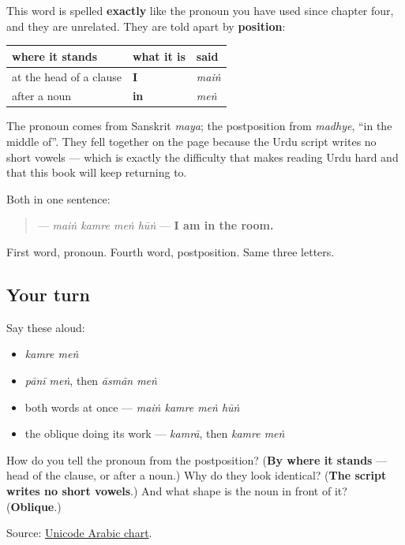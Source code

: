 \begin{grammarlens}[title={Grammar Lens: the same spelling, two different words}]
This word is spelled \textbf{exactly} like the pronoun \textbf{} you have used since chapter four, and they are unrelated. They are told apart by \textbf{position}:

\noindent
\begin{tabularx}{\linewidth}{@{}>{\raggedright\arraybackslash}X>{\raggedright\arraybackslash}X>{\raggedright\arraybackslash}X@{}}
\toprule
\textbf{where it stands} & \textbf{what it is} & \textbf{said} \\
\midrule
at the head of a clause & \textbf{I} & \emph{maiṅ} \\
after a noun & \textbf{in} & \emph{meṅ} \\
\bottomrule
\end{tabularx}

The pronoun comes from Sanskrit \emph{maya}; the postposition from \emph{madhye}, \textquotedblleft{}in the middle of\textquotedblright{}. They fell together on the page because the Urdu script writes no short vowels — which is exactly the difficulty that makes reading Urdu hard and that this book will keep returning to.

Both in one sentence:

\begin{quote}
\textbf{   } — \emph{maiṅ kamre meṅ hūṅ} — \textbf{I am in the room.}
\end{quote}

First word, pronoun. Fourth word, postposition. Same three letters.
\end{grammarlens}

\subsection*{Your turn}
Say these aloud:

\begin{itemize}
\raggedright
  \item \emph{kamre meṅ}
  \item \emph{pānī meṅ}, then \emph{āsmān meṅ}
  \item both words at once — \emph{maiṅ kamre meṅ hūṅ}
  \item the oblique doing its work — \emph{kamrā}, then \emph{kamre meṅ}
\end{itemize}

\begin{tcolorbox}[breakable,colback=teal!4,colframe=teal!35!black,title={Before you move on}]
How do you tell the pronoun from the postposition? (\textbf{By where it stands} — head of the clause, or after a noun.) Why do they look identical? (\textbf{The script writes no short vowels}.) And what shape is the noun in front of it? (\textbf{Oblique}.)

Source: \href{https://www.unicode.org/charts/PDF/U0600.pdf}{Unicode Arabic chart}.
\end{tcolorbox}
